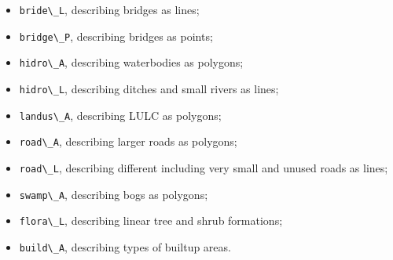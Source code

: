 \documentclass[
]{book}
\newcommand{\passthrough}[1]{#1}
\begin{document}
\begin{itemize}
\item
  \passthrough{\lstinline!bride\_L!}, describing bridges as lines;
\item
  \passthrough{\lstinline!bridge\_P!}, describing bridges as points;
\item
  \passthrough{\lstinline!hidro\_A!}, describing waterbodies as polygons;
\item
  \passthrough{\lstinline!hidro\_L!}, describing ditches and small rivers as lines;
\item
  \passthrough{\lstinline!landus\_A!}, describing LULC as polygons;
\item
  \passthrough{\lstinline!road\_A!}, describing larger roads as polygons;
\item
  \passthrough{\lstinline!road\_L!}, describing different including very small and unused roads as lines;
\item
  \passthrough{\lstinline!swamp\_A!}, describing bogs as polygons;
\item
  \passthrough{\lstinline!flora\_L!}, describing linear tree and shrub formations;
\item
  \passthrough{\lstinline!build\_A!}, describing types of builtup areas.
\end{itemize}
\end{document}
